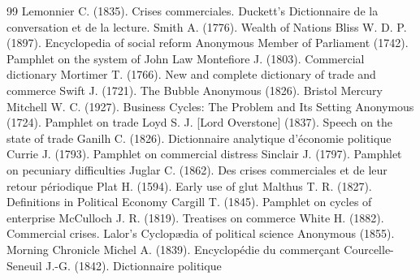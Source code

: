 \begin{RaggedRight}
\begin{thebibliography}{99}
     \hypertarget{bib:Lemonnier-1835}{} Lemonnier C. (1835). Crises commerciales. Duckett's Dictionnaire de la conversation et de la lecture.
     \hypertarget{bib:Smith-1776}{} Smith A. (1776). Wealth of Nations
     \hypertarget{bib:Bliss-1897}{} Bliss W. D. P. (1897). Encyclopedia of social reform
     \hypertarget{bib:Anonymous-1742}{} Anonymous Member of Parliament (1742). Pamphlet on the system of John Law
     \hypertarget{bib:Montefiore-1803}{} Montefiore J. (1803). Commercial dictionary
     \hypertarget{bib:Mortimer-1766}{} Mortimer T. (1766). New and complete dictionary of trade and commerce
     \hypertarget{bib:Swift-1721}{} Swift J. (1721). The Bubble
     \hypertarget{bib:Anonymous-1826}{} Anonymous (1826). Bristol Mercury
     \hypertarget{bib:Mitchell-1927}{} Mitchell W. C. (1927). Business Cycles: The Problem and Its Setting
     \hypertarget{bib:Anonymous-1724}{} Anonymous (1724). Pamphlet on trade
     \hypertarget{bib:Loyd-1837}{} Loyd S. J. [Lord Overstone] (1837). Speech on the state of trade
     \hypertarget{bib:Ganilh-1826}{} Ganilh C. (1826). Dictionnaire analytique d'économie politique
     \hypertarget{bib:Currie-1793}{} Currie J. (1793). Pamphlet on commercial distress
     \hypertarget{bib:Sinclair-1797}{} Sinclair J. (1797). Pamphlet on pecuniary difficulties
     \hypertarget{bib:Juglar-1862}{} Juglar C. (1862). Des crises commerciales et de leur retour périodique
     \hypertarget{bib:Plat-1594}{} Plat H. (1594). Early use of \textquotedbl{}glut\textquotedbl{}
     \hypertarget{bib:Malthus-1827}{} Malthus T. R. (1827). Definitions in Political Economy
     \hypertarget{bib:Cargill-1845}{} Cargill T. (1845). Pamphlet on cycles of enterprise
     \hypertarget{bib:McCulloch-1819}{} McCulloch J. R. (1819). Treatises on commerce
     \hypertarget{bib:White-1882}{} White H. (1882). Commercial crises. Lalor's Cyclopædia of political science
     \hypertarget{bib:Anonymous-1855}{} Anonymous (1855). Morning Chronicle
     \hypertarget{bib:Michel-1839}{} Michel A. (1839). Encyclopédie du commerçant
     \hypertarget{bib:Courcelle-Seneuil-1842}{} Courcelle-Seneuil J.-G. (1842). Dictionnaire politique

\end{thebibliography}
\end{RaggedRight}
